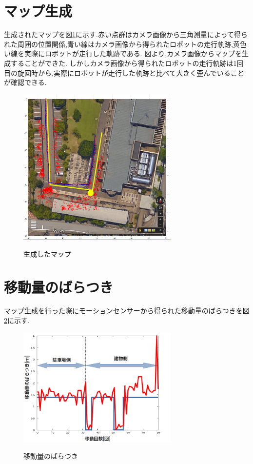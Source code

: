 \documentclass[12pt,oneside]{sotsuken_paper}
\begin{document}
\section{マップ生成}
生成されたマップを図\ref{fig:mapp}に示す.赤い点群はカメラ画像から三角測量によって得られた周囲の位置関係,青い線はカメラ画像から得られたロボットの走行軌跡,黄色い線を実際にロボットが走行した軌跡である.
図より,カメラ画像からマップを生成することができた.
しかしカメラ画像から得られたロボットの走行軌跡は1回目の旋回時から,実際にロボットが走行した軌跡と比べて大きく歪んでいることが確認できる.

\begin{figure}[htp]
 \begin{center}
  \includegraphics[width=80mm]{img/soft/2.png}
 　\caption{生成したマップ}
  \label{fig:mapp}%
 \end{center}
\end{figure}

\section{移動量のばらつき}
マップ生成を行った際にモーションセンサーから得られた移動量のばらつきを図\ref{fig:gps}に示す.

\begin{figure}[htp]
 \begin{center}
  \includegraphics[width=80mm]{img/soft/gps.png}
 　\caption{移動量のばらつき}
  \label{fig:gps}%
 \end{center}
\end{figure}
\end{document}
